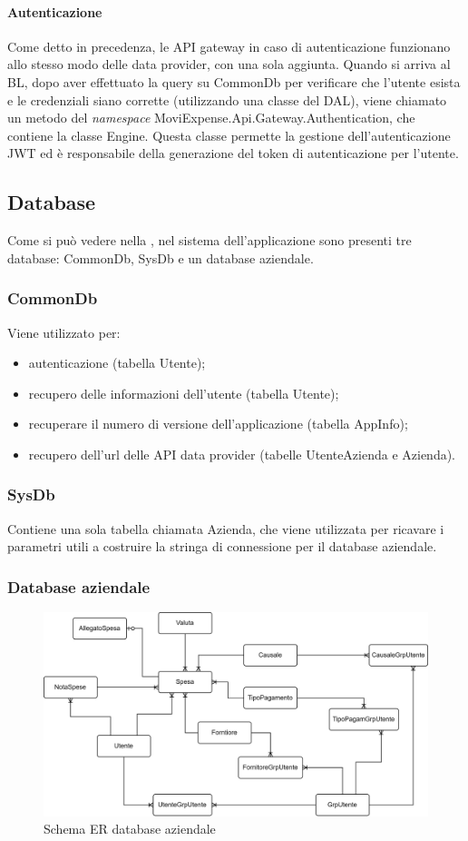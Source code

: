 \paragraph{Autenticazione} Come detto in precedenza, le \gls{API} gateway in caso di autenticazione funzionano allo stesso modo delle data provider, con una sola aggiunta. Quando si arriva al BL, dopo aver effettuato la query su CommonDb per verificare che l'utente esista e le credenziali siano corrette (utilizzando una classe del DAL), viene chiamato un metodo del \emph{namespace} MoviExpense.Api.Gateway.Authentication, che contiene la classe Engine. Questa classe permette la gestione dell'autenticazione JWT ed è responsabile della generazione del token di autenticazione per l'utente.


\subsection{Database}

Come si può vedere nella , nel sistema dell'applicazione sono presenti tre database: CommonDb, SysDb e un database aziendale.

\subsubsection{CommonDb}

Viene utilizzato per:
\begin{itemize}
    \item autenticazione (tabella Utente);
    \item recupero delle informazioni dell'utente (tabella Utente);
    \item recuperare il numero di versione dell'applicazione (tabella AppInfo);
    \item recupero dell'url delle \gls{API} data provider (tabelle UtenteAzienda e Azienda).
\end{itemize}

\subsubsection{SysDb}

Contiene una sola tabella chiamata Azienda, che viene utilizzata per ricavare i parametri utili a costruire la stringa di connessione per il database aziendale.

\subsubsection{Database aziendale}

\begin{figure}[H]
    \centering
    \includegraphics[width=\columnwidth]{images/ER moviEXPENSE.png}
    \caption{Schema ER database aziendale}
\end{figure}

